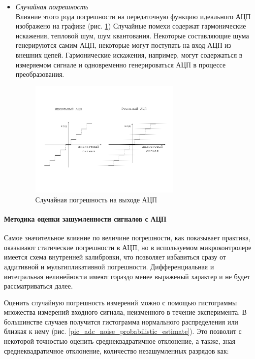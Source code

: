 \begin{itemize}
    \item \textit{Случайная погрешность} \\
        Влияние этого рода погрешности на передаточную функцию идеального АЦП изображено на графике
        (рис. \ref{pic_adc_code_transition_noise})
        Случайные помехи содержат гармонические искажения, тепловой шум, шум квантования.
        Некоторые составляющие шума генерируются самим АЦП, некоторые могут поступать на вход АЦП
        из внешних цепей. Гармонические искажения, например, могут содержаться в измеряемом сигнале
        и одновременно генерироваться АЦП в процессе преобразования.

        \begin{figure}[!ht]
            \centering
            \includegraphics[width=0.7\textwidth, keepaspectratio, clip=true, trim=5mm 35mm 5mm 35mm]
                            {./src/pictures/adc_code_transition_noise}
            \caption{Случайная погрешность на выходе АЦП}
            \label{pic_adc_code_transition_noise}
        \end{figure}
\end{itemize}

\paragraph{ Методика оценки зашумленности сигналов с АЦП }
Самое значительное влияние по величине погрешности, как показывает практика, оказывают статические
погрешности в АЦП, но в используемом микроконтролере имеется схема внутренней калибровки, что позволяет
избавиться сразу от аддитивной и мультипликативной погрешности. Дифференциальная и интегральная
нелинейности имеют гораздо менее выраженый характер и не будет рассматриваться далее.

Оценить случайную погрешность измерений можно с помощью гистограммы множества измерений
входного сигнала, неизменного в течение эксперимента. В большинстве случаев получится
гистограмма нормального распределения или близкая к нему
(рис. \ref{pic_adc_noise_probabilistic_estimate}). Это позволит с некоторой точностью
оценить среднеквадратичное отклонение, а также, зная среднеквадратичное отклонение, количество
незашумленных разрядов как:

